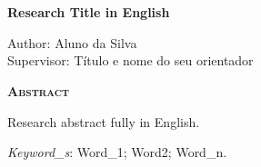 \chapter*{}

\begin{center}
	{\Large{\textbf{Research Title in English}}}
\end{center}

\vspace{1cm}

\begin{flushright}
	Author: Aluno da Silva\\
	Supervisor: Título e nome do seu orientador
\end{flushright}

\vspace{1cm}

\begin{center}
	\Large{\textsc{\textbf{Abstract}}}
\end{center}

\noindent Research abstract fully in English.

\noindent\textit{Keyword\_s}: Word\_1; Word2; Word\_n.